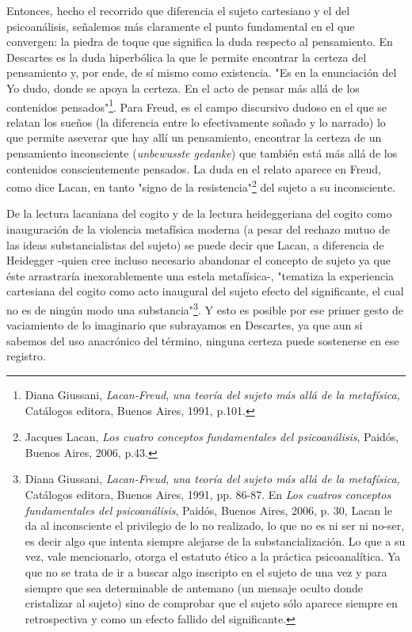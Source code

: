 \documentclass{book}
\begin{document}
Entonces, hecho el recorrido que diferencia el sujeto cartesiano y el
del psicoanálisis, señalemos más claramente el punto fundamental en el
que convergen: la piedra de toque que significa la duda respecto al
pensamiento. En Descartes es la duda hiperbólica la que le permite
encontrar la certeza del pensamiento y, por ende, de sí mismo como
existencia. "Es en la enunciación del Yo dudo, donde se apoya la
certeza. En el acto de pensar más allá de los contenidos
pensados"\footnote{Diana Giussani, \emph{Lacan-Freud}, \emph{una teoría
  del sujeto más allá de la metafísica,} Catálogos editora, Buenos
  Aires, 1991, p.101.}. Para Freud, es el campo discursivo dudoso en el
que se relatan los sueños (la diferencia entre lo efectivamente soñado y
lo narrado) lo que permite aseverar que hay allí un pensamiento,
encontrar la certeza de un pensamiento inconsciente (\emph{unbewusste
gedanke}) que también está más allá de los contenidos conscientemente
pensados. La duda en el relato aparece en Freud, como dice Lacan, en
tanto "signo de la resistencia"\footnote{Jacques Lacan, \emph{Los cuatro
  conceptos fundamentales del psicoanálisis}, Paidós, Buenos Aires,
  2006, p.43.} del sujeto a su inconsciente.

De la lectura lacaniana del cogito y de la lectura heideggeriana del
cogito como inauguración de la violencia metafísica moderna (a pesar del
rechazo mutuo de las ideas substancialistas del sujeto) se puede decir
que Lacan, a diferencia de Heidegger -quien cree incluso necesario
abandonar el concepto de sujeto ya que éste arrastraría inexorablemente
una estela metafísica-, "tematiza la experiencia cartesiana del cogito
como acto inaugural del sujeto efecto del significante, el cual no es de
ningún modo una substancia"\footnote{Diana Giussani, \emph{Lacan-Freud},
  \emph{una teoría del sujeto más allá de la metafísica,} Catálogos
  editora, Buenos Aires, 1991, pp. 86-87. En \emph{Los cuatros conceptos
  fundamentales del psicoanálisis}, Paidós, Buenos Aires, 2006, p. 30,
  Lacan le da al inconsciente el privilegio de lo no realizado, lo que
  no es ni ser ni no-ser, es decir algo que intenta siempre alejarse de
  la substancialización. Lo que a su vez, vale mencionarlo, otorga el
  estatuto ético a la práctica psicoanalítica. Ya que no se trata de ir
  a buscar algo inscripto en el sujeto de una vez y para siempre que sea
  determinable de antemano (un mensaje oculto donde cristalizar al
  sujeto) sino de comprobar que el sujeto sólo aparece siempre en
  retrospectiva y como un efecto fallido del significante.}. Y esto es
posible por ese primer gesto de vaciamiento de lo imaginario que
subrayamos en Descartes, ya que aun si sabemos del uso anacrónico del
término, ninguna certeza puede sostenerse en ese registro.
\end{document}
